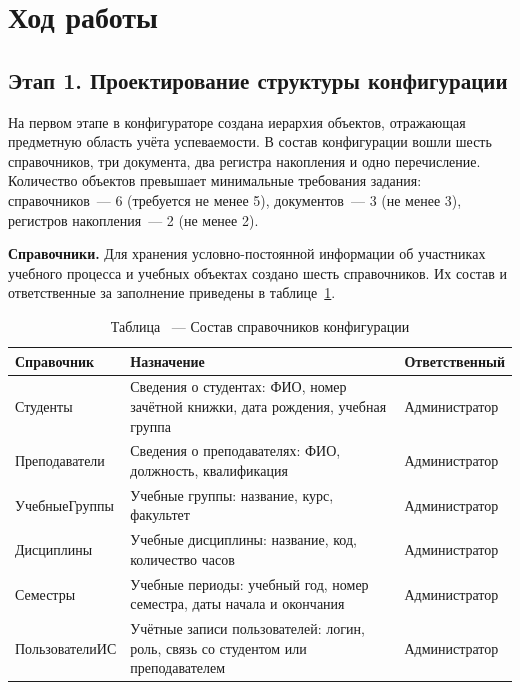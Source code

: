 \documentclass[14pt,a4paper]{extarticle}
\begin{document}
\section{Ход работы}

\subsection{Этап 1. Проектирование структуры конфигурации}

На первом этапе в конфигураторе создана иерархия объектов, отражающая
предметную область учёта успеваемости. В состав конфигурации вошли шесть
справочников, три документа, два регистра накопления и одно перечисление.
Количество объектов превышает минимальные требования задания: справочников~---
6 (требуется не менее 5), документов~--- 3 (не менее 3), регистров
накопления~--- 2 (не менее 2).

\noindent\textbf{Справочники.}
Для хранения условно-постоянной информации об участниках учебного процесса
и учебных объектах создано шесть справочников. Их состав и ответственные
за заполнение приведены в таблице~\ref{tab:refs}.

\begin{table}[H]
    \centering
    \caption{Таблица \thetable\ --- Состав справочников конфигурации}
    \label{tab:refs}
    \footnotesize
    \begin{tabularx}{\textwidth}{@{}l >{\raggedright\arraybackslash}X l@{}}
        \toprule
        Справочник & Назначение & Ответственный \\
        \midrule
        Студенты & Сведения о студентах: ФИО, номер зачётной книжки, дата
        рождения, учебная группа & Администратор \\
        Преподаватели & Сведения о преподавателях: ФИО, должность,
        квалификация & Администратор \\
        УчебныеГруппы & Учебные группы: название, курс, факультет &
        Администратор \\
        Дисциплины & Учебные дисциплины: название, код, количество часов &
        Администратор \\
        Семестры & Учебные периоды: учебный год, номер семестра, даты начала и
        окончания & Администратор \\
        ПользователиИС & Учётные записи пользователей: логин, роль, связь со
        студентом или преподавателем & Администратор \\
        \bottomrule
    \end{tabularx}
    \addtocounter{table}{-1}
\end{table}
\end{document}
